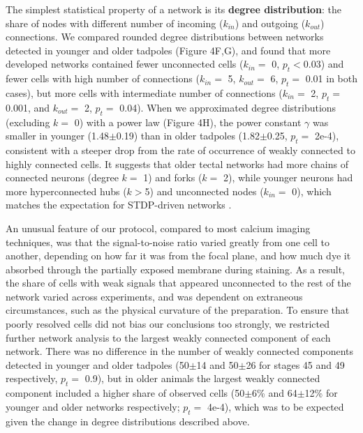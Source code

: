 \documentclass{article}
\begin{document}
The simplest statistical property of a network is its \textbf{degree distribution}: the share of nodes with different number of incoming ($k_{in}$) and outgoing ($k_{out}$) connections. We compared rounded degree distributions between networks detected in younger and older tadpoles (Figure 4F,G), and found that more developed networks contained fewer unconnected cells ($k_{in}=$ 0, $p_t<$0.03) and fewer cells with high number of connections ($k_{in}=$ 5, $k_{out}=$ 6, $p_t=$ 0.01 in both cases), but more cells with intermediate number of connections ($k_{in}=$ 2, $p_t=$ 0.001, and $k_{out}=$ 2, $p_t=$ 0.04). When we approximated degree distributions (excluding $k=$ 0) with a power law (Figure 4H), the power constant $\gamma$ was smaller in younger (1.48$\pm$0.19) than in older tadpoles (1.82$\pm$0.25, $p_t=$ 2e-4), consistent with a steeper drop from the rate of occurrence of weakly connected to highly connected cells. It suggests that older tectal networks had more chains of connected neurons (degree $k=$ 1) and forks ($k=$ 2), while younger neurons had more hyperconnected hubs ($k>$5) and unconnected nodes ($k_{in}=$ 0), which matches the expectation for STDP-driven networks \citep{fiete2010chains}.

An unusual feature of our protocol, compared to most calcium imaging techniques, was that the signal-to-noise ratio varied greatly from one cell to another, depending on how far it was from the focal plane, and how much dye it absorbed through the partially exposed membrane during staining. As a result, the share of cells with weak signals that appeared unconnected to the rest of the network varied across experiments, and was dependent on extraneous circumstances, such as the physical curvature of the preparation. To ensure that poorly resolved cells did not bias our conclusions too strongly, we restricted further network analysis to the largest weakly connected component of each network. There was no difference in the number of weakly connected components detected in younger and older tadpoles (50$\pm$14 and 50$\pm$26 for stages 45 and 49 respectively, $p_t=$ 0.9), but in older animals the largest weakly connected component included a higher share of observed cells (50$\pm$6\% and 64$\pm$12\% for younger and older networks respectively; $p_t=$ 4e-4), which was to be expected given the change in degree distributions described above.
\end{document}
